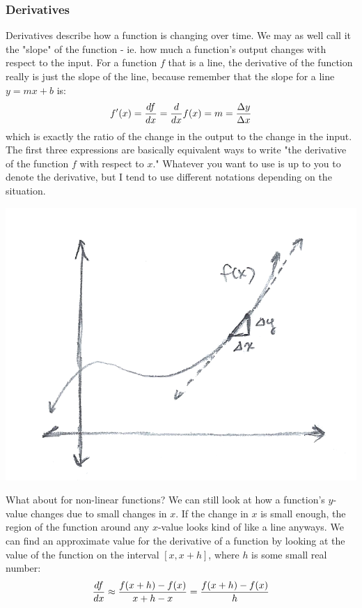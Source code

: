 \subsubsection{Derivatives}
Derivatives describe how a function is changing over time. We may as well call it the "slope" of the function - ie. how much a function's output changes with respect to the input. For a function $f$ that is a line, the derivative of the function really is just the slope of the line, because remember that the slope for a line $y = mx+b$ is:
\[
	f'(x) = \frac{d f}{d x} = \frac{d }{d x}f(x) = m = \frac{\Delta y}{\Delta x} 
\]	
which is exactly the ratio of the change in the output to the change in the input.\\
The first three expressions are basically equivalent ways to write "the derivative of the function $f$ with respect to $x$." Whatever you want to use is up to you to denote the derivative, but I tend to use different notations depending on the situation. 
\begin{center}
	\includegraphics[scale=0.3]{images/math/calc/derivative.png}
\end{center}
What about for non-linear functions? We can still look at how a function's $y$-value changes due to small changes in $x$. If the change in $x$ is small enough, the region of the function around any $x$-value looks kind of like a line anyways. We can find an approximate value for the derivative of a function by looking at the value of the function on the interval $[x, x+h]$, where $h$ is some small real number: 
\[
	\frac{d f}{d x} \approx \frac{f(x+h) - f(x)}{x+h - x} = \frac{f(x+h) - f(x)}{h}
\]
